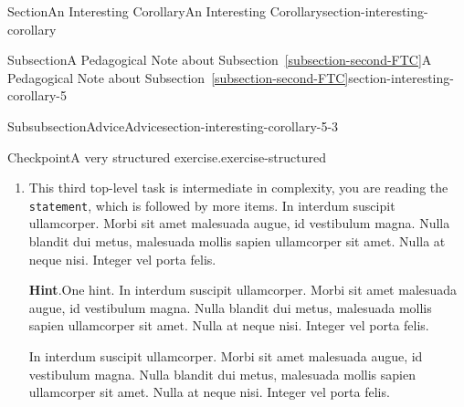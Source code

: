 \documentclass[twoside,10pt,]{article}
\newcommand{\blocktitlefont}{\relax}
\newcommand{\xreffont}{\relax}
\newcommand{\mono}[1]{\texttt{#1}}
\numberwithin{equation}{section}
\begin{document}
\begin{sectionptx}{Section}{An Interesting Corollary}{}{An Interesting Corollary}{}{}{section-interesting-corollary}
\begin{subsectionptx}{Subsection}{A Pedagogical Note about Subsection~{\xreffont\ref*{subsection-second-FTC}}}{}{A Pedagogical Note about Subsection~{\xreffont\ref*{subsection-second-FTC}}}{}{}{section-interesting-corollary-5}
\begin{subsubsectionptx}{Subsubsection}{Advice}{}{Advice}{}{}{section-interesting-corollary-5-3}
\begin{inlineexercise}{Checkpoint}{A very structured exercise.}{exercise-structured}
\begin{enumerate}[font=\bfseries,label=(\alph*),ref=\alph*]
\begin{enumerate}[font=\bfseries,label=(\roman*),ref=\theenumi.\roman*]
\begin{enumerate}[font=\bfseries,label=(\Alph*),ref=\theenumi.\theenumii.\Alph*]
\item{}Third subsubtask.  In interdum suscipit ullamcorper. Morbi sit amet malesuada augue, id vestibulum magna. Nulla blandit dui metus, malesuada mollis sapien ullamcorper sit amet. Nulla at neque nisi. Integer vel porta felis.%
\par
In interdum suscipit ullamcorper%
\par
In interdum suscipit ullamcorper. Morbi sit amet malesuada augue, id vestibulum magna. Nulla blandit dui metus, malesuada mollis sapien ullamcorper sit amet. Nulla at neque nisi. Integer vel porta felis.%
\end{enumerate}%
The conclusion of the structured subtask.  In interdum suscipit ullamcorper. Morbi sit amet malesuada augue, id vestibulum magna. Nulla blandit dui metus, malesuada mollis sapien ullamcorper sit amet. Nulla at neque nisi. Integer vel porta felis.%
\item{}A simple task as the last subtask.  In interdum suscipit ullamcorper. Morbi sit amet malesuada augue, id vestibulum magna. Nulla blandit dui metus, malesuada mollis sapien ullamcorper sit amet. Nulla at neque nisi. Integer vel porta felis.%
\end{enumerate}%
This concludes our structured second task.  In interdum suscipit ullamcorper. Morbi sit amet malesuada augue, id vestibulum magna. Nulla blandit dui metus, malesuada mollis sapien ullamcorper sit amet. Nulla at neque nisi. Integer vel porta felis.%
\item{}This third top-level task is intermediate in complexity, you are reading the \mono{statement}, which is followed by more items. In interdum suscipit ullamcorper. Morbi sit amet malesuada augue, id vestibulum magna. Nulla blandit dui metus, malesuada mollis sapien ullamcorper sit amet. Nulla at neque nisi. Integer vel porta felis.%
\par\smallskip%
\noindent\textbf{\blocktitlefont Hint}.\hypertarget{exercise-structured-6-2}{}\quad{}One hint.  In interdum suscipit ullamcorper. Morbi sit amet malesuada augue, id vestibulum magna. Nulla blandit dui metus, malesuada mollis sapien ullamcorper sit amet. Nulla at neque nisi. Integer vel porta felis.%
\par
In interdum suscipit ullamcorper. Morbi sit amet malesuada augue, id vestibulum magna. Nulla blandit dui metus, malesuada mollis sapien ullamcorper sit amet. Nulla at neque nisi. Integer vel porta felis.%
\par\smallskip%

\end{enumerate}
\end{inlineexercise}
\end{subsubsectionptx}
\end{subsectionptx}
\end{sectionptx}
\end{document}
